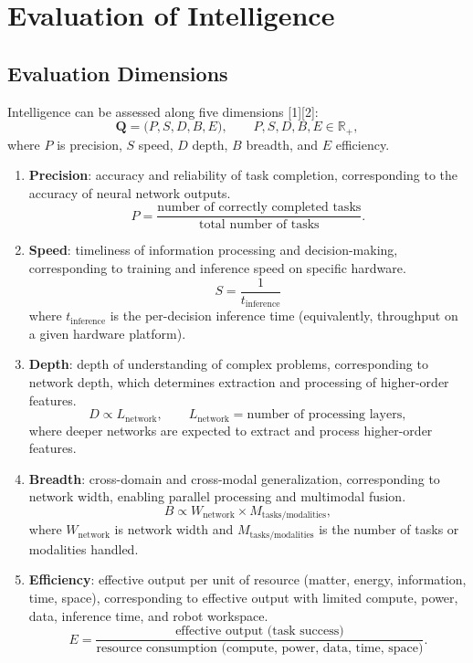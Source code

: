 \documentclass[12pt,a4paper]{article}
\begin{document}
\section{Evaluation of Intelligence}
\subsection{Evaluation Dimensions}
Intelligence can be assessed along five dimensions [1][2]:
\begin{equation}
\mathbf{Q}=\bigl(P,S,D,B,E\bigr),\qquad
P,S,D,B,E\in\mathbb{R}_{+},
\label{eq:eval-vector}
\end{equation}
where $P$ is precision, $S$ speed, $D$ depth, $B$ breadth, and $E$ efficiency.

\begin{enumerate}
\item \textbf{Precision}: accuracy and reliability of task completion, corresponding to the accuracy of neural network outputs.
\begin{equation}
P=\frac{\text{number of correctly completed tasks}}{\text{total number of tasks}}.
\label{eq:eval-precision}
\end{equation}
\item \textbf{Speed}: timeliness of information processing and decision-making, corresponding to training and inference speed on specific hardware.
\begin{equation}
S=\frac{1}{t_{\mathrm{inference}}}
\label{eq:eval-speed}
\end{equation}
where $t_{\mathrm{inference}}$ is the per-decision inference time (equivalently, throughput on a given hardware platform).
\item \textbf{Depth}: depth of understanding of complex problems, corresponding to network depth, which determines extraction and processing of higher-order features.
\begin{equation}
D\propto L_{\mathrm{network}},\qquad L_{\mathrm{network}}=\text{number of processing layers},
\label{eq:eval-depth}
\end{equation}
where deeper networks are expected to extract and process higher-order features.
\item \textbf{Breadth}: cross-domain and cross-modal generalization, corresponding to network width, enabling parallel processing and multimodal fusion.
\begin{equation}
B\propto W_{\mathrm{network}}\times M_{\mathrm{tasks/modalities}},
\label{eq:eval-breadth}
\end{equation}
where $W_{\mathrm{network}}$ is network width and $M_{\mathrm{tasks/modalities}}$ is the number of tasks or modalities handled.
\item \textbf{Efficiency}: effective output per unit of resource (matter, energy, information, time, space), corresponding to effective output with limited compute, power, data, inference time, and robot workspace.
\begin{equation}
E=\frac{\text{effective output (task success)}}{\text{resource consumption (compute, power, data, time, space)}}.
\label{eq:eval-efficiency}
\end{equation}
\end{enumerate}
\end{document}
